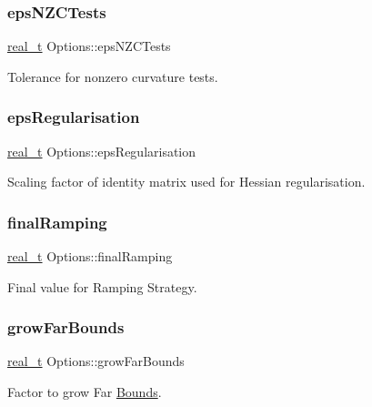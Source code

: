 \subsubsection{\texorpdfstring{eps\+N\+Z\+C\+Tests}{epsNZCTests}}
{\footnotesize\ttfamily \hyperlink{qp_o_a_s_e_s__wrapper_8h_a0d00e2b3dfadee81331bbb39068570c4}{real\+\_\+t} Options\+::eps\+N\+Z\+C\+Tests}

Tolerance for nonzero curvature tests. \mbox{\label{class_options_a3521b2ae6a97e3f10f08ef8130ca7a49}} 
\subsubsection{\texorpdfstring{eps\+Regularisation}{epsRegularisation}}
{\footnotesize\ttfamily \hyperlink{qp_o_a_s_e_s__wrapper_8h_a0d00e2b3dfadee81331bbb39068570c4}{real\+\_\+t} Options\+::eps\+Regularisation}

Scaling factor of identity matrix used for Hessian regularisation. \mbox{\label{class_options_adf4a78f73d1efb4f645e9875e2f8be07}} 
\subsubsection{\texorpdfstring{final\+Ramping}{finalRamping}}
{\footnotesize\ttfamily \hyperlink{qp_o_a_s_e_s__wrapper_8h_a0d00e2b3dfadee81331bbb39068570c4}{real\+\_\+t} Options\+::final\+Ramping}

Final value for Ramping Strategy. \mbox{\label{class_options_a5331179ac3983d3e57d7d6a80e3c8175}} 
\subsubsection{\texorpdfstring{grow\+Far\+Bounds}{growFarBounds}}
{\footnotesize\ttfamily \hyperlink{qp_o_a_s_e_s__wrapper_8h_a0d00e2b3dfadee81331bbb39068570c4}{real\+\_\+t} Options\+::grow\+Far\+Bounds}

Factor to grow Far \hyperlink{class_bounds}{Bounds}. \mbox{\label{class_options_a2ec58bd7731426a3eb260ed7a9ad481c}} 
